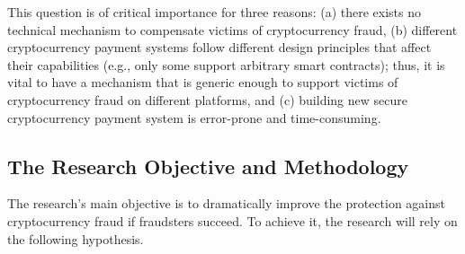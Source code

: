 

This question is of critical importance for three reasons: (a) there exists no technical mechanism to compensate victims of cryptocurrency fraud, (b) different cryptocurrency payment systems follow different design principles that affect their capabilities (e.g., only some support arbitrary smart contracts); thus, it is vital to have a mechanism that is generic enough to support victims of cryptocurrency fraud on different platforms, and (c) building new secure cryptocurrency payment system is error-prone and time-consuming. 






\vspace{-5mm}
\subsection{The Research Objective and Methodology}
\vspace{-2mm}

The research’s main objective is to dramatically improve the protection against cryptocurrency fraud if fraudsters succeed. To achieve it, the research will rely on the following hypothesis. 

 
 
 
 \vs
\noindent{}

